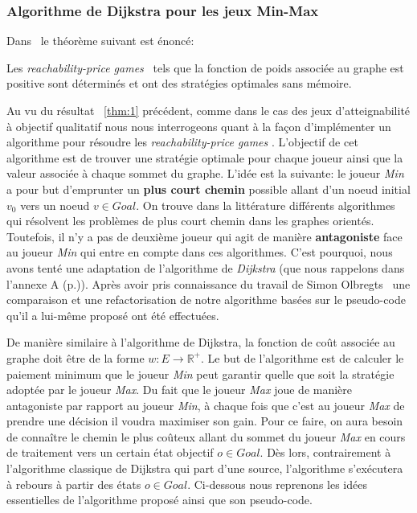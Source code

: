 


\subsubsection{Algorithme de Dijkstra pour les jeux Min-Max}

Dans~\cite{DBLP:conf/lfcs/BrihayePS13} le théorème suivant est énoncé:

\begin{thm}
	\label{thm:1}
	Les \og\textit{reachability-price games}\fg~ tels que la fonction de poids associée au graphe est positive sont déterminés et ont des stratégies optimales sans mémoire.
\end{thm}


Au vu du résultat ~\ref{thm:1} précédent, comme dans le cas des jeux d'atteignabilité à objectif qualitatif nous nous interrogeons quant à la façon d'implémenter un algorithme pour résoudre les \og \textit{reachability-price games} \fg. L'objectif de cet algorithme est de trouver une stratégie optimale pour chaque joueur ainsi que la valeur associée à chaque sommet du graphe. L'idée est la suivante: le joueur \textit{Min} a pour but d'emprunter un \textbf{plus court chemin} possible allant d'un noeud initial $v_{0}$ vers un noeud $v \in Goal$. On trouve dans la littérature différents algorithmes qui résolvent les problèmes de plus court chemin dans les graphes orientés. Toutefois, il n'y a pas de deuxième joueur qui agit de manière \textbf{antagoniste} face au joueur \textit{Min} qui entre en compte dans ces algorithmes. C'est pourquoi, nous avons tenté une adaptation de l'algorithme de \textit{Dijkstra} (que nous rappelons dans l'annexe A (p.\pageref{algo:dijkstra})). Après avoir pris connaissance du travail de Simon Olbregts~\cite{simon} une comparaison et une refactorisation de notre algorithme basées sur le pseudo-code qu'il a lui-même proposé ont été effectuées.

De manière similaire à l'algorithme de Dijkstra, la fonction de coût associée au graphe doit être de la forme $w : E \rightarrow \mathbb{R}^{+}$. Le but de l'algorithme est de calculer le paiement minimum que le joueur \textit{Min} peut garantir quelle que soit la stratégie adoptée par le joueur \textit{Max}. Du fait que le joueur \textit{Max} joue de manière antagoniste par rapport au joueur \textit{Min}, à chaque fois que c'est au joueur \textit{Max} de prendre une décision il voudra maximiser son gain. Pour ce faire, on aura besoin de connaître le chemin le plus coûteux allant du sommet du joueur \textit{Max} en cours de traitement vers un certain état objectif $o \in Goal$. Dès lors, contrairement à l'algorithme classique de Dijkstra qui part d'une source, l'algorithme s'exécutera à rebours à partir des états $o \in Goal$. Ci-dessous nous reprenons les idées essentielles de l'algorithme proposé ainsi que son pseudo-code.\\

